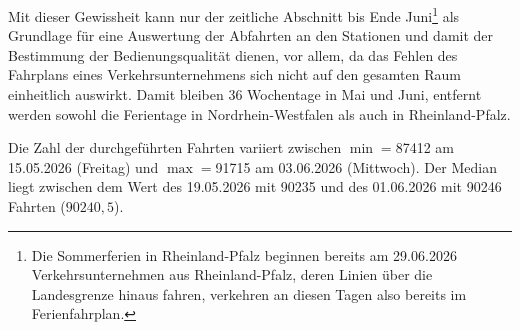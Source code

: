 \documentclass[11pt,pdftex,a4paper]{scrartcl}
\begin{document}
	Mit dieser Gewissheit kann nur der zeitliche Abschnitt bis Ende Juni\footnote{Die Sommerferien in Rheinland-Pfalz beginnen bereits am 29.06.2026 Verkehrsunternehmen aus Rheinland-Pfalz, deren Linien über die Landesgrenze hinaus fahren, verkehren an diesen Tagen also bereits im Ferienfahrplan.} als Grundlage für eine Auswertung der Abfahrten an den Stationen und damit der Bestimmung der Bedienungsqualität dienen, vor allem, da das Fehlen des Fahrplans eines Verkehrsunternehmens sich nicht auf den gesamten Raum einheitlich auswirkt. Damit bleiben \num{36} Wochentage in Mai und Juni, entfernt werden sowohl die Ferientage in Nordrhein-Westfalen als auch in Rheinland-Pfalz. 
	
	Die Zahl der durchgeführten Fahrten variiert zwischen $\min=$\num{87412} am 15.05.2026 (Freitag) und $\max=$\num{91715} am 03.06.2026 (Mittwoch). Der Median liegt zwischen dem Wert des 19.05.2026 mit \num{90235} und des 01.06.2026 mit \num{90246} Fahrten ($90240,5$).
	
\end{document}
